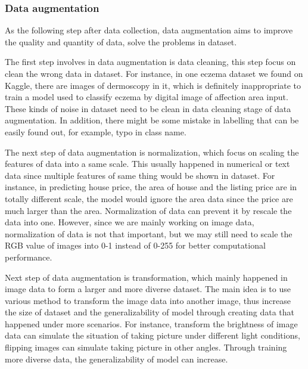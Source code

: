             \subsubsection{Data augmentation}\label{dataArg}
                As the following step after data collection, data augmentation aims to  improve the quality and quantity of data, solve the problems in dataset.

                The first step involves in data augmentation is data cleaning, this step focus on clean the wrong data in dataset. For instance, in one eczema dataset we found on Kaggle, there are images of dermoscopy in it, which is definitely inappropriate to train a model used to classify eczema by digital image of affection area input. These kinds of noise in dataset need to be clean in data cleaning stage of data augmentation. In addition, there might be some mistake in labelling that can be easily found out, for example, typo in class name.

                The next step of data augmentation is normalization, which focus on scaling the features of data into a same scale. This usually happened in numerical or text data since multiple features of same thing would be shown in dataset. For instance, in predicting house price, the area of house and the listing price are in totally different scale, the model would ignore the area data since the price are much larger than the area. Normalization of data can prevent it by rescale the data into one. However, since we are mainly working on image data, normalization of data is not that important, but we may still need to scale the RGB value of images into 0-1 instead of 0-255 for better computational performance.

                Next step of data augmentation is transformation, which mainly happened in image data to form a larger and more diverse dataset. The main idea is to use various method to transform the image data into another image, thus increase the size of dataset and the generalizability of model through creating data that happened under more scenarios. For instance, transform the brightness of image data can simulate the situation of taking picture under different light conditions, flipping images can simulate taking picture in other angles. Through training more diverse data, the generalizability of model can increase. 

